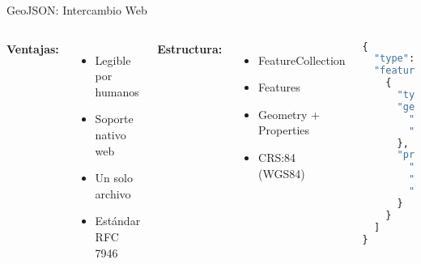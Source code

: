 \documentclass[10pt]{beamer}
\begin{document}
\begin{frame}[fragile]{GeoJSON: Intercambio Web}
    \begin{columns}
        \textbf{Ventajas:}
        \begin{itemize}
            \item Legible por humanos
            \item Soporte nativo web
            \item Un solo archivo
            \item Estándar RFC 7946
        \end{itemize}
        
        \textbf{Estructura:}
        \begin{itemize}
            \item FeatureCollection
            \item Features
            \item Geometry + Properties
            \item CRS:84 (WGS84)
        \end{itemize}
        
        \begin{lstlisting}[language=Python, caption=Ejemplo GeoJSON]
{
  "type": "FeatureCollection",
  "features": [
    {
      "type": "Feature",
      "geometry": {
        "type": "Point",
        "coordinates": [-70.651, -33.438]
      },
      "properties": {
        "nombre": "USACH",
        "tipo": "Universidad",
        "estudiantes": 22000
      }
    }
  ]
}
        \end{lstlisting}
    \end{columns}
\end{frame}
\end{document}
